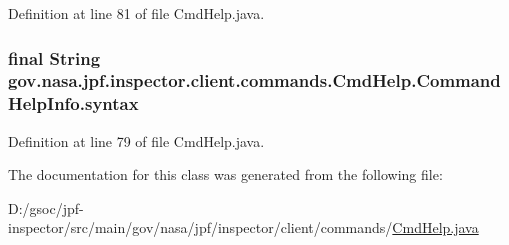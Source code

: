 Definition at line 81 of file Cmd\+Help.\+java.

\subsubsection[{\texorpdfstring{syntax}{syntax}}]{\setlength{\rightskip}{0pt plus 5cm}final String gov.\+nasa.\+jpf.\+inspector.\+client.\+commands.\+Cmd\+Help.\+Command\+Help\+Info.\+syntax\hspace{0.3cm}{\ttfamily [private]}}\hypertarget{classgov_1_1nasa_1_1jpf_1_1inspector_1_1client_1_1commands_1_1_cmd_help_1_1_command_help_info_a4d409ae170049b77efbc1c895415383d}{}\label{classgov_1_1nasa_1_1jpf_1_1inspector_1_1client_1_1commands_1_1_cmd_help_1_1_command_help_info_a4d409ae170049b77efbc1c895415383d}


Definition at line 79 of file Cmd\+Help.\+java.



The documentation for this class was generated from the following file\+:\begin{DoxyCompactItemize}
\item 
D\+:/gsoc/jpf-\/inspector/src/main/gov/nasa/jpf/inspector/client/commands/\hyperlink{_cmd_help_8java}{Cmd\+Help.\+java}\end{DoxyCompactItemize}

